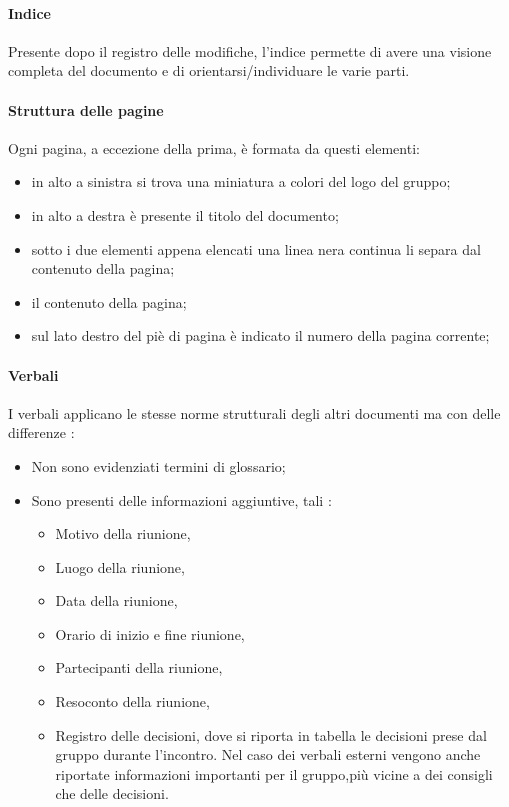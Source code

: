 \paragraph{Indice}
Presente dopo il registro delle modifiche, l’indice permette di avere una visione completa del documento e di orientarsi/individuare le varie parti.

\paragraph{Struttura delle pagine}
Ogni pagina, a eccezione della prima, è formata da questi elementi:
  \begin{itemize}
  		\item in alto a sinistra si trova una miniatura a colori del logo del gruppo;
  		\item in alto a destra è presente il titolo del documento;
  		\item sotto i due elementi appena elencati una linea nera continua li separa dal contenuto della pagina;
  		\item il contenuto della pagina;
  		\item sul lato destro del piè di pagina è indicato il numero della pagina corrente;
	\end{itemize}
	
\paragraph{Verbali}
I verbali applicano le stesse norme strutturali degli altri documenti ma con delle differenze :
  \begin{itemize}
  		\item Non sono evidenziati termini di glossario;
  		\item Sono presenti delle informazioni aggiuntive, tali :
  		\begin{itemize}
  		\item Motivo della riunione,
  		\item Luogo della riunione,
  		\item Data della riunione,
  		\item Orario di inizio e fine riunione,
  		\item Partecipanti della riunione,
  		\item Resoconto della riunione,
  		\item Registro delle decisioni, dove si riporta in tabella le decisioni prese dal gruppo durante l’incontro. Nel caso dei verbali esterni vengono anche riportate informazioni importanti per il gruppo,più vicine a dei consigli che delle decisioni.
  		\end{itemize}  		
	\end{itemize}
	
